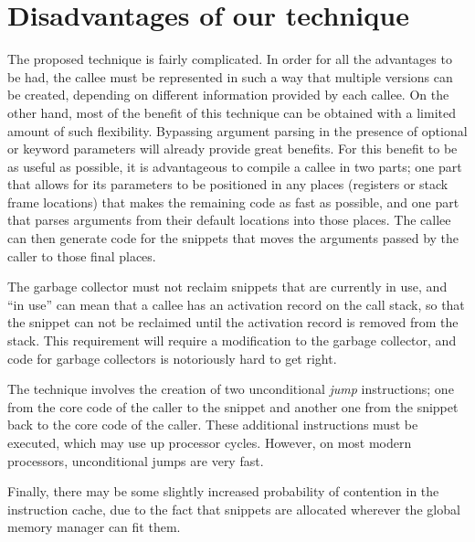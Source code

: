 \section{Disadvantages of our technique}

The proposed technique is fairly complicated.  In order for all the
advantages to be had, the callee must be represented in such a way
that multiple versions can be created, depending on different
information provided by each callee.  On the other hand, most of the
benefit of this technique can be obtained with a limited amount of
such flexibility.  Bypassing argument parsing in the presence of
optional or keyword parameters will already provide great benefits.
For this benefit to be as useful as possible, it is advantageous to
compile a callee in two parts; one part that allows for its parameters
to be positioned in any places (registers or stack frame locations)
that makes the remaining code as fast as possible, and one part that
parses arguments from their default locations into those places.  The
callee can then generate code for the snippets that moves the
arguments passed by the caller to those final places.

The garbage collector must not reclaim snippets that are currently in
use, and ``in use'' can mean that a callee has an activation record on
the call stack, so that the snippet can not be reclaimed until the
activation record is removed from the stack.  This requirement will
require a modification to the garbage collector, and code for garbage
collectors is notoriously hard to get right.

The technique involves the creation of two unconditional \emph{jump}
instructions; one from the core code of the caller to the snippet and
another one from the snippet back to the core code of the caller.
These additional instructions must be executed, which may use up
processor cycles.  However, on most modern processors, unconditional
jumps are very fast.

Finally, there may be some slightly increased probability of
contention in the instruction cache, due to the fact that snippets are
allocated wherever the global memory manager can fit them.

